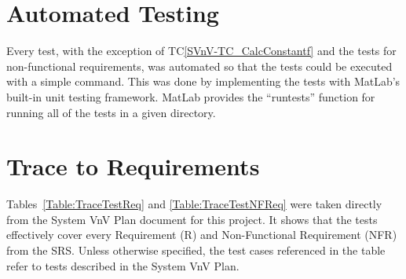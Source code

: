 \documentclass[12pt, titlepage]{article}
\newcommand{\tcref}[1]{TC\ref{#1}}
\begin{document}
\section{Automated Testing} \label{sec_AutoTests}

Every test, with the exception of \tcref{SVnV-TC_CalcConstantf} and the tests 
for non-functional requirements, was automated so that the tests could be 
executed with a simple command. This was done by implementing the tests with 
MatLab's built-in unit testing framework. MatLab provides the ``runtests'' 
function for running all of the tests in a given directory.
		
\section{Trace to Requirements} \label{sec_TraceReq}

Tables~\ref{Table:TraceTestReq} and \ref{Table:TraceTestNFReq} were taken 
directly from the System VnV Plan document for this project. It shows that the 
tests effectively cover every Requirement (R) and Non-Functional Requirement 
(NFR) from the SRS. Unless otherwise specified, the test cases referenced in 
the table refer to tests described in the System VnV Plan.
\end{document}
